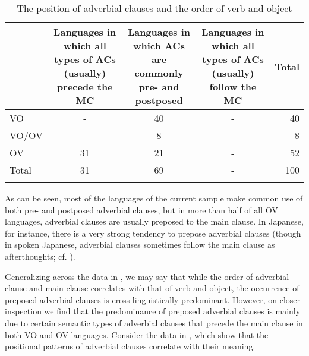 \documentclass[output=paper]{langsci/langscibook}
\begin{document}
\begin{table}
\small
\begin{tabularx}{\textwidth}{lSSSr}
\lsptoprule
&   Languages in which all types of ACs (usually) precede the MC &   Languages in which ACs are commonly pre- and postposed &   Languages in which all types of ACs (usually) follow the MC &   Total\\
\midrule 
VO & - & 40 & - & 40\\
VO/OV & - & 8 & - & 8\\
OV & 31 & 21 & - & 52\\
\midrule
Total & 31 & 69 & - & 100\\
\lspbottomrule
\end{tabularx}

\caption{The position of adverbial clauses and the order of verb and object}
\label{tab:diessel:1}
\end{table}

As can be seen, most of the languages of the current sample make common use of both pre- and postposed adverbial clauses, but in more than half of all OV languages, adverbial clauses are usually preposed to the main clause. In Japanese, for instance, there is a very strong tendency to prepose adverbial clauses (though in spoken Japanese, adverbial clauses sometimes follow the main clause as afterthoughts; cf. \citealt{FordMori1994}).

Generalizing across the data in , we may say that while the order of adverbial clause and main clause correlates with that of verb and object, the occurrence of preposed adverbial clauses is cross-linguistically predominant. However, on closer inspection we find that the predominance of preposed adverbial clauses is mainly due to certain semantic types of adverbial clauses that precede the main clause in both VO and OV languages. Consider the data in , which show that the positional patterns of adverbial clauses correlate with their meaning.  
\end{document}
